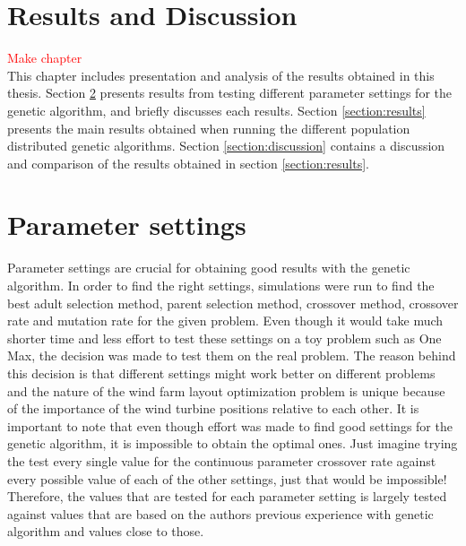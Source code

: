 \documentclass[12pt]{report}
\begin{document}
\section{Results and Discussion}\label{chapter:results}


\textcolor{red}{Make chapter}\\


\noindent This chapter includes presentation and analysis of the results obtained in this thesis. Section \ref{section:parameter settings} presents results from testing different parameter settings for the genetic algorithm, and briefly discusses each results. Section \ref{section:results} presents the main results obtained when running the different population distributed genetic algorithms. Section \ref{section:discussion} contains a discussion and comparison of the results obtained in section \ref{section:results}.


\section{Parameter settings}\label{section:parameter settings}
Parameter settings are crucial for obtaining good results with the genetic algorithm. In order to find the right settings, simulations were run to find the best adult selection method, parent selection method, crossover method, crossover rate and mutation rate for the given problem. Even though it would take much shorter time and less effort to test these settings on a toy problem such as One Max, the decision was made to test them on the real problem. The reason behind this decision is that different settings might work better on different problems and the nature of the wind farm layout optimization problem is unique because of the importance of the wind turbine positions relative to each other. It is important to note that even though effort was made to find good settings for the genetic algorithm,  it is impossible to obtain the optimal ones. Just imagine trying the test every single value for the continuous parameter crossover rate against every possible value of each of the other settings, just that would be impossible! Therefore, the values that are tested for each parameter setting is largely tested against values that are based on the authors previous experience with genetic algorithm and values close to those.\\
\end{document}
